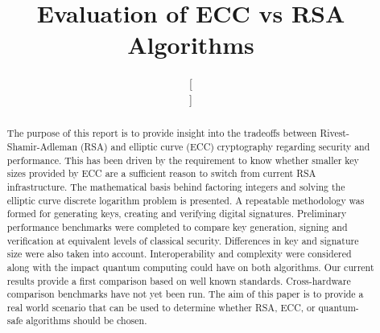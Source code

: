 \documentclass[conference]{IEEEtran}
\begin{document}
\title{Evaluation of ECC vs RSA Algorithms\\}

\author{
\and
{}
\and[\hfill\mbox{}\par\vspace{1em}\mbox{}\hfill]
}

\maketitle

\begin{abstract}
The purpose of this report is to provide insight into the tradeoffs between Rivest-Shamir-Adleman (RSA) and elliptic curve (ECC) cryptography regarding security and performance. This has been driven by the requirement to know whether smaller key sizes provided by ECC are a sufficient reason to switch from current RSA infrastructure. The mathematical basis behind factoring integers and solving the elliptic curve discrete logarithm problem is presented. A repeatable methodology was formed for generating keys, creating and verifying digital signatures. Preliminary performance benchmarks were completed to compare key generation, signing and verification at equivalent levels of classical security. Differences in key and signature size were also taken into account. Interoperability and complexity were considered along with the impact quantum computing could have on both algorithms. Our current results provide a first comparison based on well known standards. Cross-hardware comparison benchmarks have not yet been run. The aim of this paper is to provide a real world scenario that can be used to determine whether RSA, ECC, or quantum-safe algorithms should be chosen. 
\end{abstract}
\end{document}
